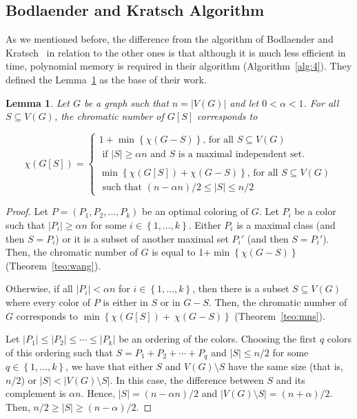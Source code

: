 \documentclass[fleqn,10pt]{SelfArx} %
\newtheorem{lema}{Lemma}
\newcommand{\chaves}[1] {\ensuremath{{\left \{ {#1} \right \}}}}
\newcommand{\Min}[1] {\ensuremath{\min\chaves{#1}}}
\begin{document}
	\subsection{Bodlaender and Kratsch Algorithm}\label{sec:bodlaender-kratsch}
	
	As we mentioned before, the difference from the algorithm of Bodlaender and Kratsch~\cite{BodlaenderKratsch06} in relation to the other ones is that
	although it is much less efficient in time, polynomial memory is required
	in their algorithm (Algorithm~\ref{alg:4}). They defined the Lemma~\ref{lema:bod} as the base of their work.
	
	
	\begin{lema}\label{lema:bod}
		Let $G$ be a graph such that $n = |V(G)|$ and let $0 < \alpha < 1$. For all
		$S \subseteq V(G)$, the chromatic number of $G[S]$ corresponds to
		\begin{small}
		\begin{equation}
		\chi(G[S]) 
		= 
		\begin{cases}
		1 + \Min{\chi(G-S)} \text{, } \text{for all } S \subseteq V(G) \\
		\text{ if } |S| \geq \alpha n \text{ and } S \text{ is a maximal independent set.} \\
		\\
		\Min{\chi(G[S])+\chi(G-S)} \text{, } 
		\text{for all } S \subseteq V(G) \\ \text{ such that } (n-\alpha n)/2 \leq |S| \leq n/2   
		\end{cases}
		\end{equation}
		\end{small}
		
	\end{lema}

	\begin{proof} 
		Let $P = (P_1,P_2, \ldots,P_k)$ be an optimal coloring of $G$. Let $P_i$
		be a color such that $|P_i| \geq \alpha n$ for some
		$i \in \chaves{1, \ldots,k}$. Either $P_i$ is a maximal class (and then $S = P_i$) or it is a subset
		of another maximal set $P_i'$ (and then $S = P_i'$). Then, the chromatic number of $G$ is
		equal to 1+$\Min{\chi(G-S)}$ (Theorem~\ref{teo:wang}).
		
		Otherwise, if all $|P_i| < \alpha n$ for $i \in \chaves{1, \ldots,k}$, then there is a
		subset $S \subseteq V(G)$ where every color of $P$ is either in $S$ or
		in $G-S$. Then, the chromatic number of $G$ corresponds to
		$\Min{\chi(G[S])+~\chi(G-S)}$ (Theorem~\ref{teo:mns}).
		
		Let $|P_1| \leq |P_2| \leq \cdots \leq |P_k|$ be an ordering of the colors. Choosing the first $q$ colors of this ordering such
		that $S = P_1 + P_2 + \cdots + P_q$ and $|S| \leq n/2$ for some $q \in \chaves{1, \ldots,k}$, we have that either $S$ and $V(G) \setminus S$ have the same
		size (that is, $n/2$) or $|S| < |V(G) \setminus S|$. In this case, the
		difference between $S$ and its complement is $\alpha n$. Hence, $|S| =
		(n-\alpha n)/2$ and $|V(G) \setminus S| = (n+\alpha)/2$. Then, $n/2 \geq |S| \geq (n-\alpha)/2$.
	\end{proof}
	
\end{document}
